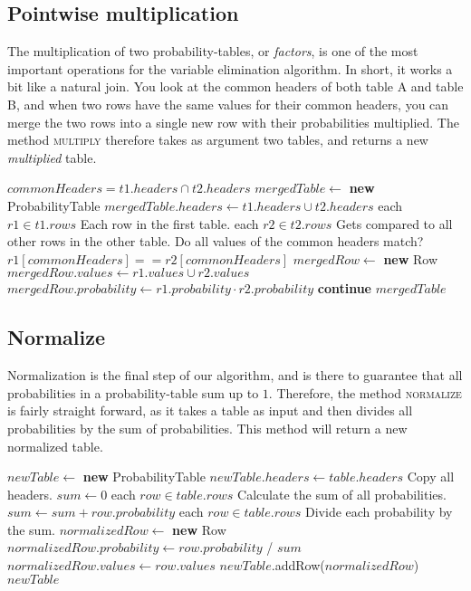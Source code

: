 \documentclass[10pt,a4paper]{article}
\begin{document}
\subsection{Pointwise multiplication}
The multiplication of two probability-tables, or \emph{factors}, is one of the most important operations for the variable elimination algorithm. In short, it works a bit like a natural join. You look at the common headers of both table A and table B, and when two rows have the same values for their common headers, you can merge the two rows into a single new row with their probabilities multiplied. The method \textsc{multiply} therefore takes as argument two tables, and returns a new \emph{multiplied} table.
\begin{codebox}
\li $commonHeaders = t1.headers \cap t2.headers$
\li $mergedTable \gets $ \textbf{new} ProbabilityTable
\li $mergedTable.headers \gets t1.headers \cup t2.headers$
\zi
\li \For each $r1 \in t1.rows$ \Comment Each row in the first table. \Do
\li     \For each $r2 \in t2.rows$ \Comment Gets compared to all other rows in the other table. \Do
\zi         \Comment Do all values of the common headers match?
\li         \If $r1[commonHeaders] == r2[commonHeaders]$ \Then
\li             $mergedRow \gets $ \textbf{new} Row
\li             $mergedRow.values \gets r1.values \cup r2.values$
\li             $mergedRow.probability \gets r1.probability \cdot r2.probability$
\li         \Else
\li             \textbf{continue}
            \End
        \End
    \End
\zi
\li \Return $mergedTable$
\end{codebox}
\subsection{Normalize}
Normalization is the final step of our algorithm, and is there to guarantee that all probabilities in a probability-table sum up to $1$. Therefore, the method \textsc{normalize} is fairly straight forward, as it takes a table as input and then divides all probabilities by the sum of probabilities. This method will return a new normalized table.
\begin{codebox}
\li $newTable \gets $ \textbf{new} ProbabilityTable
\li $newTable.headers \gets table.headers$ \Comment Copy all headers.
\li $sum \gets 0$
\li \For each $row \in table.rows$ \Comment Calculate the sum of all probabilities. \Do
\li     $sum \gets sum + row.probability$
    \End
\li \For each $row \in table.rows$ \Comment Divide each probability by the sum. \Do
\li     $normalizedRow \gets $ \textbf{new} Row
\li     $normalizedRow.probability \gets row.probability$ / $sum$
\li     $normalizedRow.values \gets row.values$
\li     $newTable$.{\sc addRow}($normalizedRow$)
    \End
\li \Return $newTable$
\end{codebox}
\end{document}
